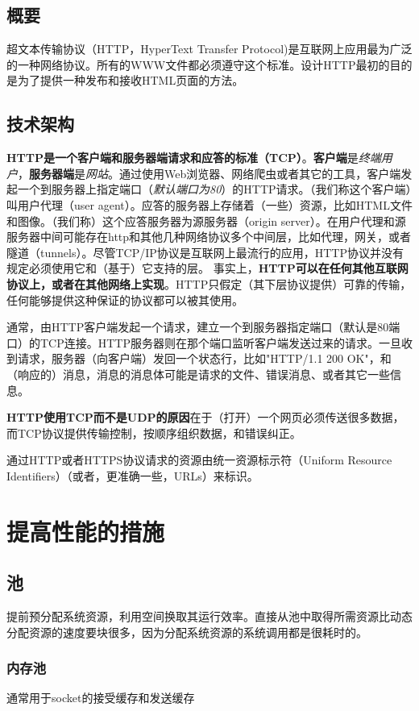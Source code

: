 \documentclass[UTF8,a4paper,8pt]{ctexbook}
\begin{document}
		\subsection{概要}
			超文本传输协议（HTTP，HyperText Transfer Protocol)是互联网上应用最为广泛的一种网络协议。所有的WWW文件都必须遵守这个标准。设计HTTP最初的目的是为了提供一种发布和接收HTML页面的方法。
		
		\subsection{技术架构}
			\textbf{HTTP是一个客户端和服务器端请求和应答的标准（TCP）}。\textbf{客户端}是\textit{终端用户}，\textbf{服务器端}是\textit{网站}。通过使用Web浏览器、网络爬虫或者其它的工具，客户端发起一个到服务器上指定端口（\textit{默认端口为80}）的HTTP请求。（我们称这个客户端）叫用户代理（user agent）。应答的服务器上存储着（一些）资源，比如HTML文件和图像。（我们称）这个应答服务器为源服务器（origin server）。在用户代理和源服务器中间可能存在http和其他几种网络协议多个中间层，比如代理，网关，或者隧道（tunnels）。尽管TCP/IP协议是互联网上最流行的应用，HTTP协议并没有规定必须使用它和（基于）它支持的层。 事实上，\textbf{HTTP可以在任何其他互联网协议上，或者在其他网络上实现}。HTTP只假定（其下层协议提供）可靠的传输，任何能够提供这种保证的协议都可以被其使用。
			
			通常，由HTTP客户端发起一个请求，建立一个到服务器指定端口（默认是80端口）的TCP连接。HTTP服务器则在那个端口监听客户端发送过来的请求。一旦收到请求，服务器（向客户端）发回一个状态行，比如"HTTP/1.1 200 OK"，和（响应的）消息，消息的消息体可能是请求的文件、错误消息、或者其它一些信息。

			\textbf{HTTP使用TCP而不是UDP的原因}在于（打开）一个网页必须传送很多数据，而TCP协议提供传输控制，按顺序组织数据，和错误纠正。
			
			通过HTTP或者HTTPS协议请求的资源由统一资源标示符（Uniform Resource Identifiers）（或者，更准确一些，URLs）来标识。
	\section{提高性能的措施}
		\subsection{池}
			提前预分配系统资源，利用空间换取其运行效率。直接从池中取得所需资源比动态分配资源的速度要块很多，因为分配系统资源的系统调用都是很耗时的。
			\subsubsection{内存池}
				通常用于socket的接受缓存和发送缓存
				
\end{document}
